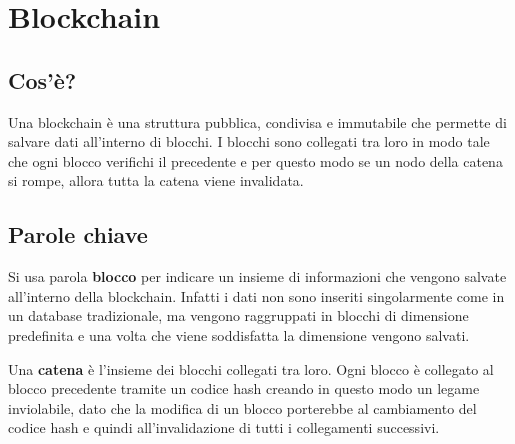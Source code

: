 \chapter{Blockchain}
\label{cha:blockchain}

\section{Cos'è?}
Una blockchain è una struttura pubblica, condivisa e immutabile che permette di
salvare dati all'interno di blocchi. I blocchi sono collegati tra loro in modo
tale che ogni blocco verifichi il precedente e per questo modo se un nodo della
catena si rompe, allora tutta la catena viene invalidata.

\section{Parole chiave}
Si usa parola \textbf{blocco} per indicare un insieme di informazioni che
vengono salvate all'interno della blockchain. Infatti i dati non sono inseriti
singolarmente come in un database tradizionale, ma vengono raggruppati in
blocchi di dimensione predefinita e una volta che viene soddisfatta la
dimensione vengono salvati.

Una \textbf{catena} è l'insieme dei blocchi collegati tra loro. Ogni blocco è 
collegato al blocco precedente tramite un codice hash creando in questo modo
un legame inviolabile, dato che la modifica di un blocco porterebbe al 
cambiamento del codice hash e quindi all'invalidazione di tutti i collegamenti
successivi.

